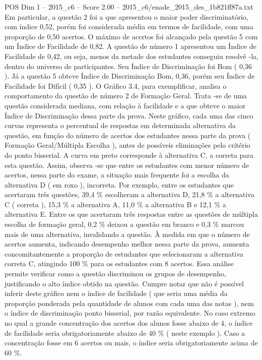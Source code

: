 \begin{textsample}{POS Dim 1 – 2015\_c6 – Score 2.00 – 2015\_c6/enade\_2015\_des\_1b821ff87a.txt}
Em particular, a questão 2 foi a que apresentou o maior poder discriminatório, com índice 0,52, porém foi considerada média em termos de facilidade, com uma proporção de 0,50 acertos.
O máximo de acertos foi alcançado pela questão 5 com um Índice de Facilidade de 0,82.
A questão de número 1 apresentou um Índice de Facilidade de 0,42, ou seja, menos da metade dos estudantes conseguiu resolvê -la, dentro do universo de participantes.
Seu Índice de Discriminação foi Bom ( 0,36 ).
Já a questão 5 obteve Índice de Discriminação Bom, 0,36, porém seu Índice de Facilidade foi Difícil ( 0,35 ).
O Gráfico 3.4, para exemplificar, analisa o comportamento da questão de número 2 de Formação Geral.
Trata -se de uma questão considerada mediana, com relação à facilidade e a que obteve o maior Índice de Discriminação dessa parte da prova.
Neste gráfico, cada uma das cinco curvas representa o percentual de respostas em determinada alternativa da questão, em função do número de acertos dos estudantes nessa parte da prova ( Formação Geral/Múltipla Escolha ), antes de possíveis eliminações pelo critério do ponto bisserial.
A curva em preto corresponde à alternativa C, a correta para esta questão.
Assim, observa -se que entre os estudantes com menor número de acertos, nessa parte do exame, a situação mais frequente foi a escolha da alternativa D ( em roxo ), incorreta.
Por exemplo, entre os estudantes que acertaram três questões, 39,4 \% escolheram a alternativa D, 21,8 \% a alternativa C ( correta ), 15,3 \% a alternativa A, 11,0 \% a alternativa B e 12,1 \% a alternativa E.
Entre os que acertaram três respostas entre as questões de múltipla escolha de formação geral, 0,2 \% deixou a questão em branco e 0,3 \% marcou mais de uma alternativa, invalidando a questão.
À medida em que o número de acertos aumenta, indicando desempenho melhor nessa parte da prova, aumenta concomitantemente a proporção de estudantes que selecionaram a alternativa correta C, atingindo 100 \% para os estudantes com 8 acertos.
Essa análise permite verificar como a questão discriminou os grupos de desempenho, justificando o alto índice obtido na questão.
Cumpre notar que não é possível inferir deste gráfico nem o índice de facilidade ( que seria uma média da proporção ponderada pela quantidade de alunos com cada uma das notas ), nem o índice de discriminação ponto bisserial, por razão equivalente.
No caso extremo no qual a grande concentração dos acertos dos alunos fosse abaixo de 4, o índice de facilidade seria obrigatoriamente abaixo de 40 \% ( neste exemplo ).
Caso a concentração fosse em 6 acertos ou mais, o índice seria obrigatoriamente acima de 60 \%.

\end{textsample}
